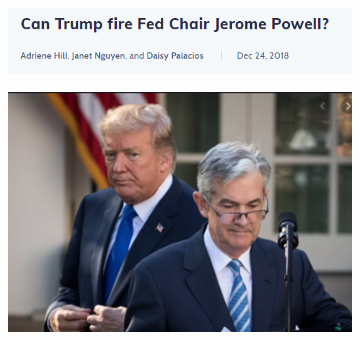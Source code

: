 \documentclass{beamer}
\begin{document}
\begin{frame}
\begin{figure}[h]
            \begin{subfigure}[h]{0.475\textwidth}
                \centering
                \includegraphics[width=0.95\hsize]{../../Output/Figures/Fire_JP_Headline.png} 
            \end{subfigure}
            \hfill
            \begin{subfigure}[h]{0.475\textwidth}
                \centering
                \includegraphics[width=0.95\hsize]{../../Output/Figures/Trump_and_JP.png}
            \end{subfigure}
    
        \end{figure}

    \end{frame}
\end{document}
